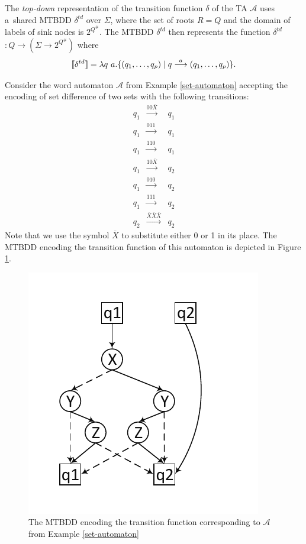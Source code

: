 The \emph{top-down} representation of the transition function $\delta$ of the TA
$\mathcal{A}$ uses a~shared MTBDD $\delta^{td}$ over $\Sigma$, where the set of
roots $R = Q$ and the domain of labels of sink nodes is $2^{Q^\#}$. The MTBDD
$\delta^{td}$ then represents the function \textlbrackdbl $\delta^{td}$
\textrbrackdbl $: Q \rightarrow (\Sigma \rightarrow 2^{Q^\#})$ where
\begin{equation} \text{\textlbrackdbl} \delta^{td} \text{\textrbrackdbl} =
\lambda q\ a .
\{(q_1,\ldots,q_p) \mid q \overset{a}{\longrightarrow} (q_1,\ldots,q_p)\}.
\end{equation}
\noindent\hrulefill
\begin{example}
 Consider the word automaton $\mathcal{A}$ from Example
 \ref{set-automaton} accepting the encoding of set difference of two sets with
 the following transitions:
 \begin{eqnarray*}
  q_1 & \overset{00\overline{X}}{\longrightarrow} & q_1\\
  q_1 & \overset{011}{\longrightarrow} & q_1\\
  q_1 & \overset{110}{\longrightarrow} & q_1\\
  q_1 & \overset{10\overline{X}}{\longrightarrow} & q_2\\
  q_1 & \overset{010}{\longrightarrow} & q_2\\
  q_1 & \overset{111}{\longrightarrow} & q_2\\
  q_2 & \overset{\overline{X}\overline{X}\overline{X}}{\longrightarrow} & q_2
 \end{eqnarray*}
  Note that we use the symbol $\overline{X}$ to substitute either 0 or 1
  in its place. The MTBDD encoding the transition function of this
  automaton is depicted in Figure \ref{mtbdd}.
 
 \begin{figure}[h!]
  \begin{center}
   \includegraphics{fig/bdd-transition-function-encoding}
  \end{center}
  \caption{The MTBDD encoding the transition function corresponding to
  $\mathcal{A}$ from Example
  \ref{set-automaton}}\label{mtbdd}
 \end{figure}
 

\end{example}
